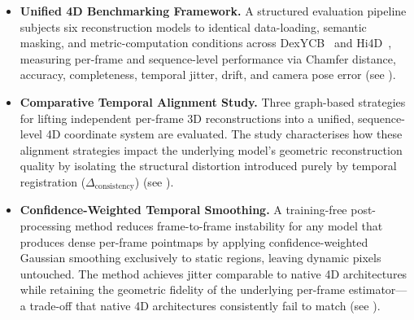 \begin{itemize}

  \item \textbf{Unified 4D Benchmarking Framework.}
        A structured evaluation pipeline subjects six reconstruction models to identical
        data-loading, semantic masking, and metric-computation conditions across DexYCB~\cite{dexycb}
        and Hi4D~\cite{hi4d}, measuring per-frame and sequence-level performance via Chamfer
        distance, accuracy, completeness, temporal jitter, drift, and camera pose error
        (see ).

\item \textbf{Comparative Temporal Alignment Study.}
        Three graph-based strategies for lifting independent per-frame 3D reconstructions 
        into a unified, sequence-level 4D coordinate system are evaluated. The study 
        characterises how these alignment strategies impact the underlying model's 
        geometric reconstruction quality by isolating the structural distortion 
        introduced purely by temporal registration ($\Delta_{\text{consistency}}$) (see ).

\item \textbf{Confidence-Weighted Temporal Smoothing.}
    A training-free post-processing method reduces frame-to-frame instability for any
    model that produces dense per-frame pointmaps by applying confidence-weighted
    Gaussian smoothing exclusively to static regions, leaving dynamic pixels untouched.
    The method achieves jitter comparable to native 4D architectures while retaining
    the geometric fidelity of the underlying per-frame estimator---a trade-off that
    native 4D architectures consistently fail to match (see ).

\end{itemize}